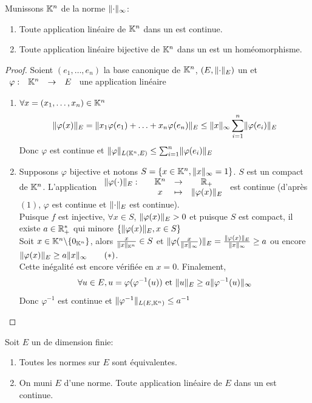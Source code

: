 \documentclass[]{report}
\begin{document}
    \begin{prop}{}{}
        Munissons $\mathbb{K}^n$ de la norme $\lVert \cdot \rVert_\infty$:
        \begin{enumerate}
            \item Toute application linéaire de $\mathbb{K}^n$ dans un \evn est continue.
            \item Toute application linéaire bijective de $\mathbb{K}^n$ dans un \evn est un homéomorphisme.
        \end{enumerate}
    \end{prop}

    \begin{proof}
        Soient $(e_1,\ldots,e_n)$ la base canonique de $\mathbb{K}^n$, $(E,\lVert \cdot \rVert_E)$ un \evn et $\begin{array}{ccccc} \varphi : & \mathbb{K}^n & \to & E \end{array}$ une application linéaire
        \begin{enumerate}
            \item $\forall x=(x_1,\ldots,x_n)\in \mathbb{K}^n$
            \[\lVert \varphi(x) \rVert_E=\lVert x_1\varphi(e_1)+\ldots+x_n\varphi(e_n) \rVert_E\le \lVert x \rVert_\infty\sum_{i=1}^{n}\lVert \varphi(e_i) \rVert_E\]
            Donc $\varphi$ est continue et $\lVert \varphi \rVert_{L(\mathbb{K}^n,E)}\le \sum_{i=1}^{n}\lVert \varphi(e_i) \rVert_E$
            \item Supposons $\varphi$ bijective et notons $S=\{x\in \mathbb{K}^n,\lVert x \rVert_\infty=1\}$. $S$ est un compact de $\mathbb{K}^n$. L'application $\begin{array}{ccccc} \lVert \varphi(\cdot) \rVert_E : & & \mathbb{K}^n & \to & \mathbb{R}_+ \\ & & x & \mapsto & \lVert \varphi(x) \rVert_E \end{array}$ est continue (d'après $(1)$, $\varphi$ est continue et $\lVert \cdot \rVert_E$ est continue).\\
            Puisque $f$ est injective, $\forall x\in S$, $\lVert \varphi(x) \rVert_E>0$ et puisque $S$ est compact, il existe $a\in \mathbb{R}_+^*$ qui minore $\{\lVert \varphi(x) \rVert_E,x\in S\}$\\
            Soit $x\in \mathbb{K}^n\backslash \{0_{\mathbb{K}^n}\}$, alors $\frac{x}{\lVert x \rVert_{\mathbb{K}^n}}\in S$ et $\lVert \varphi(\frac{x}{\lVert x \rVert_\infty}) \rVert_E=\frac{\lVert \varphi(x) \rVert_E}{\lVert x \rVert_\infty}\ge a$ ou encore $\lVert \varphi(x) \rVert_E\ge a\lVert x \rVert_\infty\qquad (*)$.\\
            Cette inégalité est encore vérifiée en $x=0$. Finalement,
            \[\forall u\in E,u=\varphi(\varphi^{-1}(u))\text{ et }\lVert u \rVert_E\ge a\lVert \varphi^{-1}(u) \rVert_\infty\]
            Donc $\varphi^{-1}$ est continue et $\lVert \varphi^{-1} \rVert_{L(E,\mathbb{K}^n)}\le a^{-1}$
        \end{enumerate}
    \end{proof}

    \begin{tm}{}{}
        Soit $E$ un \evn de dimension finie:
        \begin{enumerate}
            \item Toutes les normes sur $E$ sont équivalentes.
            \item On muni $E$ d'une norme. Toute application linéaire de $E$ dans un \evn est continue.
        \end{enumerate}
    \end{tm}
\end{document}
